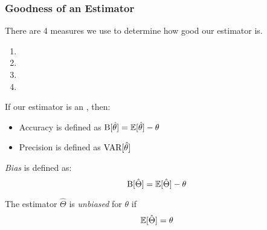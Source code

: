 		\subsubsection{Goodness of an Estimator} \label{subsubsec:Estimator Goodness}
		There are 4 measures we use to determine how good our estimator is.
			\begin{enumerate}
				\item {}
				\item {}
				\item {}
				\item {}
			\end{enumerate}
		If our estimator is an , then:
			\begin{itemize}
				\item Accuracy is defined as $\operatorname{B} [\hat{\theta} ] = \operatorname{\mathbb{E}} [\hat{\theta}] - \theta$
				\item Precision is defined as $\operatorname{\text{VAR}} [\hat{\theta}]$
			\end{itemize}
			\begin{definition}[Bias] \label{def:Bias}
				\emph{Bias} is defined as:
				\begin{equation} \label{eq:Accuracy}
					\operatorname{B} [ \hat{\Theta} ] = \operatorname{\mathbb{E}} [ \hat{\Theta} ] - \theta
				\end{equation}
				\begin{remark} \label{rmk:Unbiased}
					The estimator $\hat{\Theta}$ is \emph{unbiased} for $\theta$ if
					\begin{equation} \label{Unbiased}
						\operatorname{\mathbb{E}} [ \hat{\Theta} ] = \theta
					\end{equation}
				\end{remark}
			\end{definition}
					
